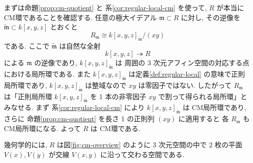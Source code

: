 \documentclass[article,paper=b5paper]{jlreq}
\begin{document}
まずは命題\ref{prop:cm-quotient} と 系\ref{cor:regular-local-cm} を使って, $R$ が本当に CM環であることを確認する.
任意の極大イデアル $\mathfrak{m}\subset R$ に対し, その逆像を
$\widetilde{\mathfrak{m}}\subset k[x,y,z]$ とおくと
\[
    R_{\mathfrak{m}}\cong k[x,y,z]_{\widetilde{\mathfrak{m}}}/(xy)
\]
である. ここで $\widetilde{\mathfrak{m}}$ は自然な全射
\[
    k[x,y,z]\twoheadrightarrow R
\]
による $\mathfrak{m}$ の逆像であり, $k[x,y,z]_{\widetilde{\mathfrak{m}}}$ は
周囲の 3 次元アフィン空間の対応する点における局所環である.
また $k[x,y,z]_{\widetilde{\mathfrak{m}}}$ は定義\ref{def:regular-local} の意味で正則局所環であり,
$k[x,y,z]_{\widetilde{\mathfrak{m}}}$ は整域なので $xy$ は零因子ではない.
したがって $R_{\mathfrak{m}}$ は「正則局所環 $k[x,y,z]_{\widetilde{\mathfrak{m}}}$ を
1 本の非零因子 $xy$ で割って得られる局所環」とみなせる.
まず 系\ref{cor:regular-local-cm} により
$k[x,y,z]_{\widetilde{\mathfrak{m}}}$ は CM局所環であり, さらに
命題\ref{prop:cm-quotient} を長さ 1 の正則列 $(xy)$ に適用すると
各 $R_{\mathfrak{m}}$ も CM局所環になる. よって $R$ は CM環である.

幾何学的には, $R$ は図\ref{fig:cm-overview} のように 3 次元空間の中で
2 枚の平面 $V(x),V(y)$ が交線 $V(x,y)$ に沿って交わる空間である.

\vspace{2\baselineskip}
\end{document}
